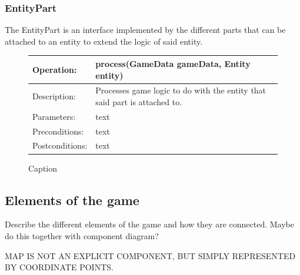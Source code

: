 \subsubsection{EntityPart}
The EntityPart is an interface implemented by the different parts that can be
attached to an entity to extend the logic of said entity.
\begin{figure}[H]
	\begin{center}
		\begin{tabulary}{1.0\textwidth}{lL}
			\toprule
			Operation:      & process(GameData gameData, Entity entity)                                 \\
			\midrule
			Description:     & Processes game logic to do with the entity that said part is attached to. \\
			\midrule
			Parameters:      & text                                                                      \\
			\midrule
			Preconditions:   & text                                                                      \\
			\midrule
			Postconditions:  & text                                                                      \\
			\bottomrule
		\end{tabulary}
	\end{center}
	\caption{Caption}
\end{figure}


\subsection{Elements of the game}
Describe the different elements of the game and how they are connected.
Maybe do this together with component diagram?

MAP IS NOT AN EXPLICIT COMPONENT, BUT SIMPLY REPRESENTED BY COORDINATE POINTS.